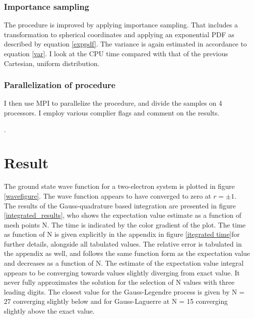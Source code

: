 \documentclass[%
reprint,
amsmath,amssymb,
aps,
]{revtex4-1}
\begin{document}
\subsubsection*{Importance sampling}\noindent 
The procedure is improved by applying importance sampling. That includes a transformation to spherical coordinates and applying an exponential PDF as described by equation \ref{exppdf}. The variance is again estimated in accordance to equation \ref{var}. I look at the CPU time compared with that of the previous Cartesian, uniform distribution.


\subsubsection*{Parallelization of procedure}
I then use MPI to parallelize the procedure, and divide the samples on 4 processors. I employ various complier flags and comment on the results.

\newpage . \newpage
\section{Result} \noindent 
The ground state wave function for a two-electron system is plotted in figure \ref{wavefigure}. The wave function appears to have converged to zero at $r = \pm 1$. \\ \indent 
The results of the Gauss-quadrature based integration are presented in figure \ref{integrated_results}, who shows the expectation value estimate as a function of mesh points N. The time is indicated by the color gradient of the plot. The time as function of N is given explicitly in the appendix in figure \ref{itegrated time}for further details, alongside all tabulated values. The relative error is tabulated in the appendix as well, and follows the same function form as the expectation value and decreases as a function of N. The estimate of the expectation value integral appears to be converging towards values slightly diverging from exact value. It never fully approximates the solution for the selection of N values with three leading digits. The closest value for the Gauss-Legendre process is given by N = 27 converging slightly below and for Gauss-Laguerre at N = 15 converging slightly above the exact value.  
\end{document}
